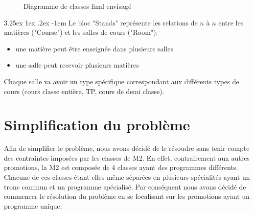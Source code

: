 \documentclass[12pt,a4paper,french]{article}
\makeatletter
\renewcommand\paragraph{\@startsection{paragraph}{5}{\z@}%
  {3.25ex \@plus1ex \@minus.2ex}%
  {-1em}%
  {\normalfont\normalsize\bfseries}}
\makeatother
\begin{document}
\begin{figure}[! ht ]
    \centering
    \begin{minipage}[t]{14 cm}
        \centering
        \caption {Diagramme de classes final envisagé}
    \end{minipage}
\end{figure}

\paragraph{}
Le bloc "Stands" représente les relations de $n$ à $n$ entre les matières ("Course") et les salles de cours ("Room"):
\begin{itemize}
\item une matière peut être enseignée dans plusieurs salles
\item une salle peut recevoir plusieurs matières
\end{itemize}

Chaque salle va avoir un type spécifique correspondant aux différents types de cours (cours classe entière, TP, cours de demi classe).

\newpage
\section{Simplification du problème}
Afin de simplifier le problème, nous avons décidé de le résoudre sans tenir compte des contraintes imposées par les classes de M2. 
En effet, contrairement aux autres promotions, la M2 est composée de 4 classes ayant des programmes différents. Chacune de ces classes étant elles-même séparées en plusieurs spécialités ayant un tronc commun et un programme spécialisé.
Par conséquent nous avons décidé de commencer le résolution du problème en se focalisant sur les promotions ayant un programme unique.\\
\end{document}

